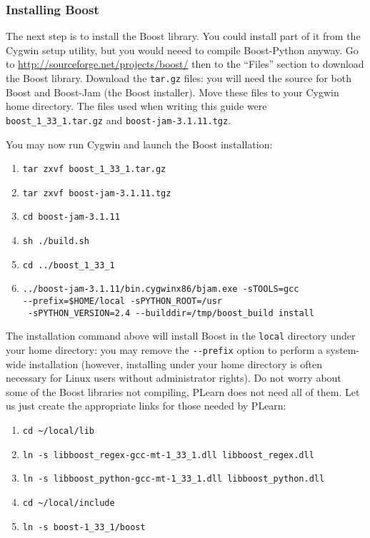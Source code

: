 \documentclass[11pt]{book}
\begin{document}
\subsubsection{Installing Boost}

The next step is to install the Boost library.
You could install part of it from the Cygwin setup utility, but you would
neeed to compile Boost-Python anyway.
Go to \url{http://sourceforge.net/projects/boost/} then to the ``Files'' section
to download
the Boost library. Download the \verb!tar.gz! files:
you will need the source for both Boost and Boost-Jam (the Boost installer).
Move these files to your Cygwin home directory.
The files used when writing this guide were \verb!boost_1_33_1.tar.gz!
and \verb!boost-jam-3.1.11.tgz!.

You may now run Cygwin and launch the Boost installation:
\begin{enumerate}
\item \verb!tar zxvf boost_1_33_1.tar.gz!
\item \verb!tar zxvf boost-jam-3.1.11.tgz!
\item \verb!cd boost-jam-3.1.11!
\item \verb!sh ./build.sh!
\item \verb!cd ../boost_1_33_1!
\item \verb!../boost-jam-3.1.11/bin.cygwinx86/bjam.exe -sTOOLS=gcc! \\
\verb!--prefix=$HOME/local -sPYTHON_ROOT=/usr! \\
\verb! -sPYTHON_VERSION=2.4 --builddir=/tmp/boost_build install!
\end{enumerate}

The installation command above will install Boost in the \verb!local! directory
under your home directory: you may remove the \verb!--prefix! option to perform
a system-wide installation (however, installing under your home directory is often
necessary for Linux users without administrator rights).
Do not worry about some of the Boost libraries not compiling, PLearn does not
need all of them.
Let us just create the appropriate links for those needed by PLearn:
\begin{enumerate}
\item \verb!cd ~/local/lib!
\item \verb!ln -s libboost_regex-gcc-mt-1_33_1.dll libboost_regex.dll!
\item \verb!ln -s libboost_python-gcc-mt-1_33_1.dll libboost_python.dll!
\item \verb!cd ~/local/include!
\item \verb!ln -s boost-1_33_1/boost!
\end{enumerate}
\end{document}
